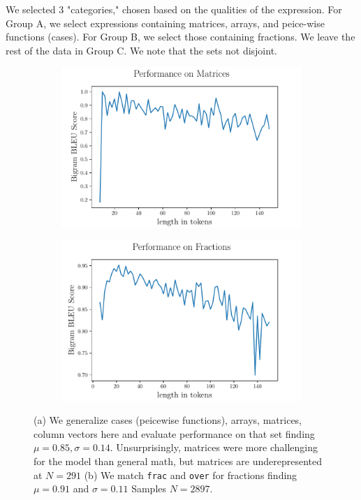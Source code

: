 \documentclass[12pt]{article}
\begin{document}
We selected 3 "categories," chosen based on the qualities of the expression. For
Group A, we select expressions containing matrices, arrays, and peice-wise
functions (cases). For Group B, we select those containing fractions. We leave
the rest of the data in Group C. We note that the sets not disjoint.
\begin{figure}[h]
	\begin{subfigure}{0.5\textwidth}
    \includegraphics[scale=.425]{scorebylenstacked.pdf}
    \centering
		\caption{}
	\end{subfigure}
  \begin{subfigure}{0.5\textwidth}
    \centering
		\includegraphics[scale=.425]{scorebyfrac.pdf}
		\caption{}
  \end{subfigure}
  \caption[Model]{(a) We generalize cases (peicewise functions), arrays,
  matrices, column vectors here and evaluate performance on that set finding
  $\mu = 0.85, \sigma=0.14$. Unsurprisingly, matrices were more challenging for
  the model than general math, but matrices are underepresented at $N=291$ (b)
  We match \texttt{frac} and \texttt{over} for fractions finding $\mu = 0.91$
  and $\sigma =0.11$ Samples $N = 2897$.}
\end{figure}
\end{document}
